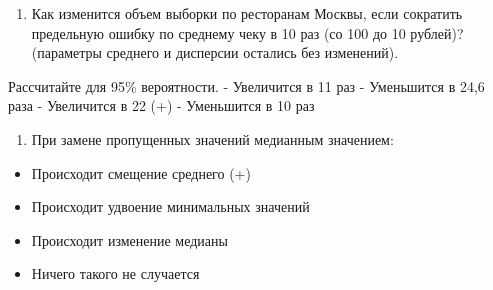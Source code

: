 \documentclass[11pt]{article}
\providecommand{\tightlist}{%
      \setlength{\itemsep}{0pt}\setlength{\parskip}{0pt}}
\begin{document}
    \begin{enumerate}
\def\labelenumi{\arabic{enumi})}
\setcounter{enumi}{13}
\tightlist
\item
  Как изменится объем выборки по ресторанам Москвы, если сократить
  предельную ошибку по среднему чеку в 10 раз (со 100 до 10 рублей)?
  (параметры среднего и дисперсии остались без изменений).
\end{enumerate}

Рассчитайте для 95\% вероятности. - Увеличится в 11 раз - Уменьшится в
24,6 раза - Увеличится в 22 (+) - Уменьшится в 10 раз

    \begin{enumerate}
\def\labelenumi{\arabic{enumi})}
\setcounter{enumi}{14}
\tightlist
\item
  При замене пропущенных значений медианным значением:
\end{enumerate}

\begin{itemize}
\tightlist
\item
  Происходит смещение среднего (+)
\item
  Происходит удвоение минимальных значений
\item
  Происходит изменение медианы
\item
  Ничего такого не случается
\end{itemize}


    
    
    
    
\end{document}
